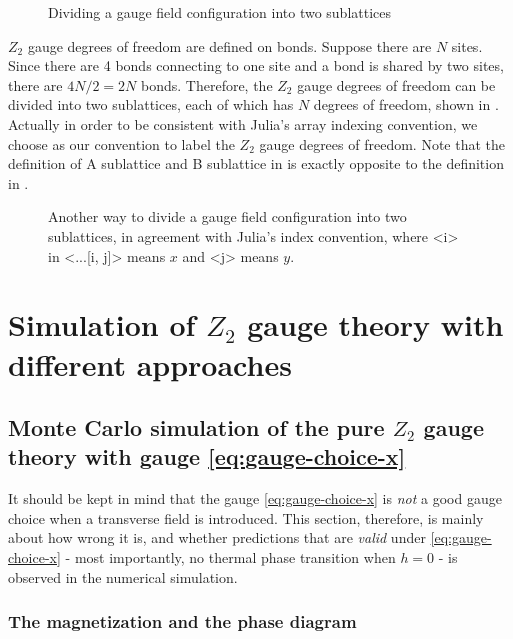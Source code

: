 \documentclass[hyperref, a4paper]{article}
\newcommand*{\Ztwo}{$\mathbb{Z}_2$ }
\def\texttt#1{<#1>}%
\def\mathbb#1{#1}%
\begin{document}
\begin{figure}
    \centering
    
    \caption{Dividing a gauge field configuration into two sublattices}
    \label{fig:z2-dividing}
\end{figure}

\Ztwo gauge degrees of freedom are defined on bonds. 
Suppose there are $N$ sites. Since there are 4 bonds connecting to one site and a bond is shared by two sites,
there are $4 N / 2 = 2 N$ bonds.
Therefore, the \Ztwo gauge degrees of freedom can be divided into two sublattices, each of which has $N$ degrees of freedom, shown in .
Actually in order to be consistent with Julia's array indexing convention, we choose  as our convention to label the \Ztwo gauge degrees of freedom.
Note that the definition of A sublattice and B sublattice in  is exactly opposite to the definition in .

\begin{figure}
    \centering
    
    \caption{Another way to divide a gauge field configuration into two sublattices, in agreement with Julia's index convention, where \texttt{i} in \texttt{...[i, j]} means $x$ and \texttt{j} means $y$.}
    \label{fig:z2-dividing-real}
\end{figure}


\section{Simulation of \Ztwo gauge theory with different approaches}

\subsection{Monte Carlo simulation of the pure \Ztwo gauge theory with gauge \eqref{eq:gauge-choice-x}}

It should be kept in mind that the gauge \eqref{eq:gauge-choice-x} is \emph{not} a good gauge choice when a transverse field is introduced.
This section, therefore, is mainly about how wrong it is, and whether predictions that are \emph{valid} under \eqref{eq:gauge-choice-x} - most importantly, no thermal phase transition when $h=0$ - is observed in the numerical simulation.

\subsubsection{The magnetization and the phase diagram}
\end{document}
